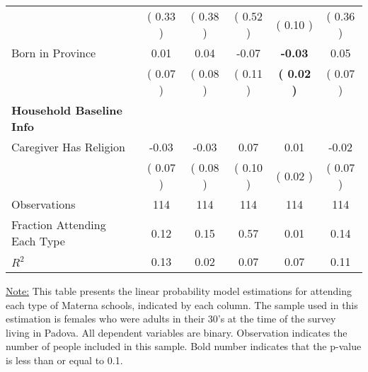 \begin{table}[H]
{\begin{tabular}{lccccc}
\quad  & (     0.33 ) & (     0.38 )  & (     0.52 )  & (     0.10 ) & (     0.36 ) \\
\quad Born in Province &      0.01 &      0.04 &     -0.07 & \textbf{    -0.03} &      0.05 \\
\quad  & (     0.07 ) & (     0.08 )  & (     0.11 )  & \textbf{(     0.02 )} & (     0.07 ) \\
\midrule
\textbf{Household Baseline Info} \\
\quad Caregiver Has Religion &     -0.03 &     -0.03 &      0.07 &      0.01 &     -0.02 \\
\quad  & (     0.07 ) & (     0.08 )  & (     0.10 )  & (     0.02 ) & (     0.07 ) \\
\midrule
Observations & 114 & 114 & 114 & 114 & 114 \\
Fraction Attending Each Type &      0.12 &      0.15 &      0.57 &      0.01 &      0.14 \\
\midrule
$ R^2$ &      0.13 &      0.02 &      0.07 &      0.07 &      0.11 \\
\bottomrule
\end{tabular}}
\end{table}
\begin{footnotesize}
\noindent\underline{Note:} This table presents the linear probability model estimations for attending each type of Materna schools, indicated by each column. The sample used in this estimation is females who were adults in their 30's at the time of the survey living in Padova. All dependent variables are binary. Observation indicates the number of people included in this sample. Bold number indicates that the p-value is less than or equal to 0.1.
\end{footnotesize}
